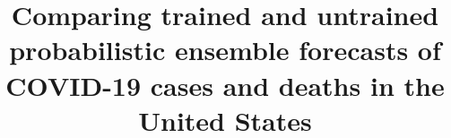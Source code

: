 \documentclass[11pt,3p,review,authoryear]{elsarticle}
\begin{document}
\begin{frontmatter}

\title{Comparing trained and untrained probabilistic ensemble forecasts of COVID-19 cases and deaths in the United States}




















\end{frontmatter}
\end{document}
